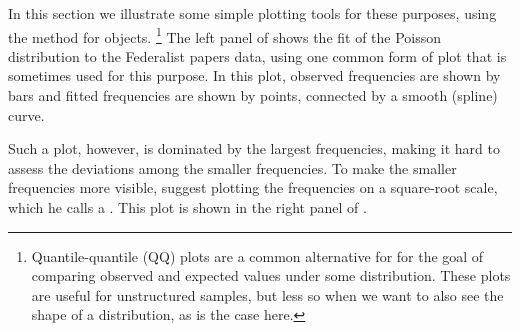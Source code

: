 \documentclass[11pt]{book}
\begin{document}
In this section we illustrate some simple plotting tools for 
these purposes, using the  method for 
 objects.%
\footnote{
Quantile-quantile (QQ) plots are a common alternative for 
for the goal of comparing observed and expected values
under some distribution.  These plots are useful for 
unstructured samples, but less so when we want to also
see the shape of a distribution, as is the case here.
}
The left panel of 
 shows the fit of the Poisson distribution to the Federalist papers data, using one common form of plot that is sometimes
used for this purpose.
In this plot, observed frequencies are shown by bars and fitted
frequencies are shown by points, connected by a smooth (spline)
curve.

Such a plot, however, is dominated by the largest frequencies,
making it hard to assess the deviations among the smaller frequencies.
To make the smaller frequencies more visible, \citet{Tukey:77}
suggest plotting the frequencies  on a square-root scale,
which he calls a . This plot is shown in the right 
panel of .
\end{document}
